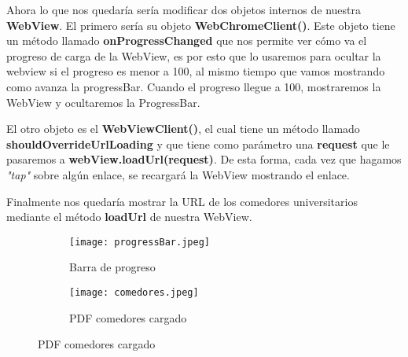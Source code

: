 \vspace{5 mm}

Ahora lo que nos quedaría sería modificar dos objetos internos de nuestra \textbf{WebView}. El primero sería su objeto \textbf{WebChromeClient()}. Este objeto tiene un método llamado \textbf{onProgressChanged} que nos permite ver cómo va el progreso de carga de la WebView, es por esto que lo usaremos para ocultar la webview si el progreso es menor a 100, al mismo tiempo que vamos mostrando como avanza la progressBar. Cuando el progreso llegue a 100, mostraremos la WebView y ocultaremos la ProgressBar.

\vspace{5 mm}

El otro objeto es el \textbf{WebViewClient()}, el cual tiene un método llamado \textbf{shouldOverrideUrlLoading} y que tiene como parámetro una \textbf{request} que le pasaremos a \textbf{webView.loadUrl(request)}. De esta forma, cada vez que hagamos \textit{"tap"} sobre algún enlace, se recargará la WebView mostrando el enlace.

\vspace{5 mm}

Finalmente nos quedaría mostrar la URL de los comedores universitarios mediante el método \textbf{loadUrl} de nuestra WebView.

\newpage

\begin{figure}[H]
\begin{subfigure}{0.5\textwidth}
  \centering
  \texttt{[image: progressBar.jpeg]}
  \caption{Barra de progreso}
  \label{fig:sub-first}
\end{subfigure}
\begin{subfigure}{0.5\textwidth}
  \centering
  \texttt{[image: comedores.jpeg]}
  \caption{PDF comedores cargado}
  \label{fig:sub-second}
\end{subfigure}
\end{figure}


